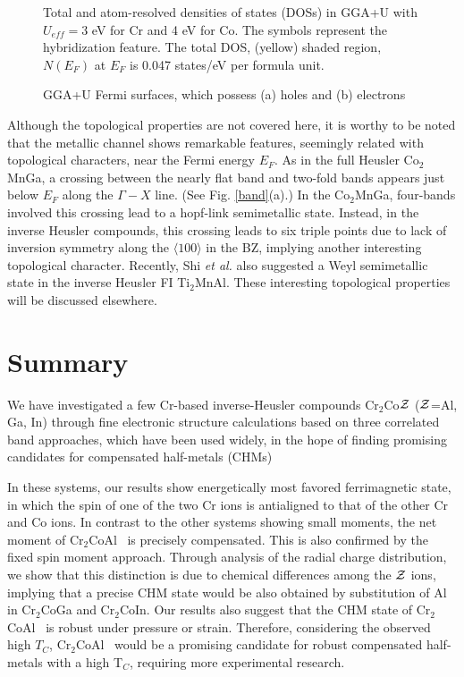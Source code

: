 \documentclass[preprint,5p]{elsarticle}
\newcommand{\cca}{Cr$_2$CoAl}
\begin{document}
\begin{figure}[tbp]
{}
\caption{Total and atom-resolved densities of states (DOSs)
in GGA+U with $U_{eff}=3$ eV for Cr and 4 eV for Co.
The symbols represent the hybridization feature.
The total DOS, (yellow) shaded region, $N(E_F)$ at $E_F$ 
is 0.047 states/eV per formula unit.
}
\label{dos}
\end{figure}

\begin{figure}[tbp]
{}
\caption{GGA+U Fermi surfaces, 
which possess (a) holes and (b) electrons
}
\label{fs}
\end{figure}

Although the topological properties are not covered here,
it is worthy to be noted that 
the metallic channel shows remarkable features, seemingly related with topological characters, 
near the Fermi energy $E_F$.
As in the full Heusler Co$_2$MnGa,\cite{hopf} 
a crossing between the nearly flat band and two-fold bands 
appears just below $E_F$ along the $\Gamma-X$ line. (See Fig. \ref{band}(a).)
In the Co$_2$MnGa, four-bands involved this crossing lead to a hopf-link semimetallic state.
Instead, in the inverse Heusler compounds, this crossing leads to six triple points 
due to lack of inversion symmetry along the $\langle 100\rangle$ in the BZ,
implying another interesting topological character.
Recently, Shi {\it et al.} also suggested a Weyl semimetallic state
in the inverse Heusler FI Ti$_2$MnAl.\cite{ifw18}
These interesting topological properties will be discussed elsewhere.\cite{nexus}



\section{Summary}
We have investigated a few Cr-based inverse-Heusler compounds 
Cr$_2$Co${\cal Z}$ (${\cal Z}$=Al, Ga, In)
through fine electronic structure calculations based on 
three correlated band approaches, which have been used widely,
in the hope of finding promising candidates for compensated half-metals (CHMs)

In these systems, our results show energetically most favored ferrimagnetic state,
in which the spin of one of the two Cr ions is antialigned to that of the other Cr and Co ions.
In contrast to the other systems showing small moments,
the net moment of \cca~ is precisely compensated.
This is also confirmed by the fixed spin moment approach.
Through analysis of the radial charge distribution,
we show that this distinction is due to chemical differences among the ${\cal Z}$ ions,
implying that a precise CHM state would be also obtained by substitution of Al in Cr$_2$CoGa and Cr$_2$CoIn.
Our results also suggest that the CHM state of \cca~ is robust under pressure or strain.
Therefore, considering the observed high $T_C$, 
\cca~ would be a promising candidate for robust compensated half-metals with a high T$_C$, 
requiring more experimental research.
\end{document}
